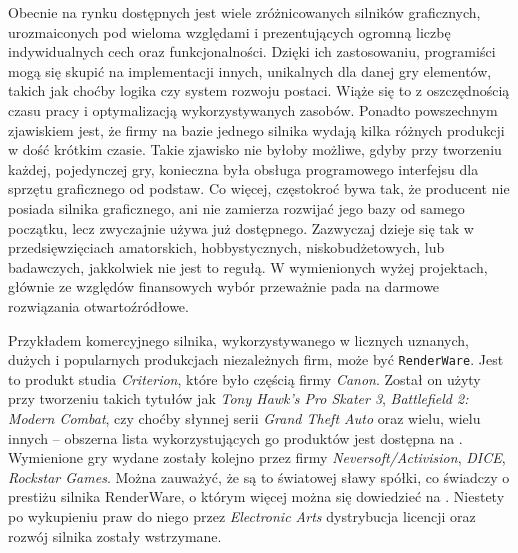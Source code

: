 \documentclass[11pt]{mwrep}
\begin{document}
    Obecnie na rynku dostępnych jest wiele zróżnicowanych silników graficznych, urozmaiconych pod wieloma względami i prezentujących ogromną liczbę indywidualnych cech oraz funkcjonalności. Dzięki ich zastosowaniu, programiści mogą się skupić na implementacji innych, unikalnych dla danej gry elementów, takich jak choćby logika czy system rozwoju postaci. Wiąże się to z oszczędnością czasu pracy i optymalizacją wykorzystywanych zasobów. Ponadto powszechnym zjawiskiem jest, że firmy na bazie jednego silnika wydają kilka różnych produkcji w dość krótkim czasie. Takie zjawisko nie byłoby możliwe, gdyby przy tworzeniu każdej, pojedynczej gry, konieczna była obsługa programowego interfejsu dla sprzętu graficznego od podstaw. Co więcej, częstokroć bywa tak, że producent nie posiada silnika graficznego, ani nie zamierza rozwijać jego bazy od samego początku, lecz zwyczajnie używa już dostępnego. Zazwyczaj dzieje się tak w przedsięwzięciach amatorskich, hobbystycznych, niskobudżetowych, lub badawczych, jakkolwiek nie jest to regułą. W wymienionych wyżej projektach, głównie ze względów finansowych wybór przeważnie pada na darmowe rozwiązania otwartoźródłowe.


    Przykładem komercyjnego silnika, wykorzystywanego w licznych uznanych, dużych i popularnych produkcjach niezależnych firm, może być \texttt{RenderWare}. Jest to produkt studia \textit{Criterion}, które było częścią firmy \textit{Canon}. Został on użyty przy tworzeniu takich tytułów jak \textit{Tony Hawk's Pro Skater 3}, \textit{Battlefield 2: Modern Combat}, czy choćby słynnej serii \textit{Grand Theft Auto} oraz wielu, wielu innych -- obszerna lista wykorzystujących go produktów jest dostępna na \cite{renderware:list}. Wymienione gry wydane zostały kolejno przez firmy \textit{Neversoft/Activision}, \textit{DICE}, \textit{Rockstar Games}. Można zauważyć, że są to światowej sławy spółki, co świadczy o prestiżu silnika RenderWare, o którym więcej można się dowiedzieć na \cite{renderware}. Niestety po wykupieniu praw do niego przez \textit{Electronic Arts} dystrybucja licencji oraz rozwój silnika zostały wstrzymane.
\end{document}
